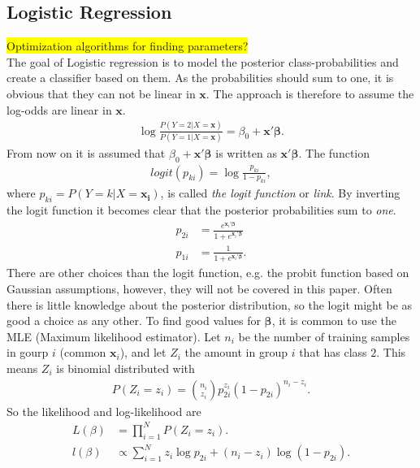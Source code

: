 \documentclass[10pt,a4paper]{article}
\begin{document}
\subsection{Logistic Regression}
\label{sub:Logistic Regression}
\colorbox{yellow}{Optimization algorithms for finding parameters?}\\
The goal of Logistic regression is to model the posterior class-probabilities and create a classifier based on them. As the probabilities should sum to one, it is obvious that they can not be linear in $\mathbf{x}$. The approach is therefore to assume the log-odds are linear in $\mathbf{x}$. 
\begin{align}
  \label{eq:logclass} 
   \log \frac{P(Y=2|X=\mathbf{x})}{P(Y=1|X=\mathbf{x})} = \beta_0 + \mathbf{x}'\bm \beta.
\end{align}
From now on it is assumed that $\beta_0 + \mathbf{x}' \bm \beta$ is written as $\mathbf{x}' \bm \beta$.
The function
\begin{align}
  logit(p_{ki}) = \log  \frac{p_{ki}}{1-p_{ki}},
\end{align}
where $p_{ki} = P(Y=k|X=\mathbf{x_i})$, is called \textit{the logit function} or \textit{link}. By inverting the logit function it becomes clear that the posterior probabilities sum to \textit{one}.
\begin{align}
  p_{2i} &=  \frac{e^{\mathbf{x}_i'\bm \beta}}{1 + e^{\mathbf{x}_i'\bm \beta}} \\
  p_{1i} &=  \frac{1}{1 + e^{\mathbf{x}_i'\bm \beta}}.
\end{align}
There are other choices than the logit function, e.g. the probit function based on Gaussian assumptions, however, they will not be covered in this paper. 
Often there is little knowledge about the posterior distribution, so the logit might be as good a choice as any other. 
To find good values for $\bm \beta$, it is common to use the MLE (Maximum likelihood estimator). Let $n_i$ be the number of training samples in gourp $i$ (common $\mathbf{x}_i$), and let $Z_i$ the amount in group $i$ that has class $2$. This means $Z_i$ is binomial distributed with
\begin{align}
  P(Z_i = z_i) = \binom{n_i}{z_i} p_{2i}^{z_i} (1-p_{2i})^{n_i - z_i}.
\end{align}
So the likelihood and log-likelihood are
\begin{align}
  L(\beta) &= \prod_{i = 1}^{N} P(Z_i = z_i). \\
  l(\beta) &\propto \sum^{N}_{i=1} z_i \log p_{2i} + (n_i - z_i) \log (1- p_{2i}).
\end{align}
\end{document}
